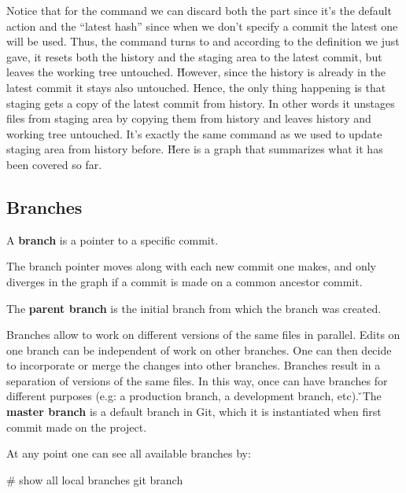 Notice that for the command  we can discard both the  part
since it's the default action and the ``latest hash'' since when we don't specify a commit the latest one will be
used. Thus, the command turns to  and according to the definition we just gave, it resets both the
history and the staging area to the latest commit, but leaves the working tree untouched. \v

However, since the history is already in the latest commit it stays also untouched. Hence, the only thing happening
is that staging gets a copy of the latest commit from history. In other words it unstages files from staging area by
copying them from history and leaves history and working tree untouched. It’s exactly the same command as we used to
update staging area from history before. \v

Here is a graph that summarizes what it has been covered so far.


\subsection{Branches}

\bd[Branch]
A \textbf{branch} is a pointer to a specific commit.
\ed

The branch pointer moves along with each new commit one makes, and only diverges in the graph if a commit is made on a
common ancestor commit.

The \textbf{parent branch} is the initial branch from which the branch was created.
\ed

Branches allow to work on different versions of the same files in parallel. Edits on one branch can be independent of
work on other branches. One can then decide to incorporate or merge the changes into other branches. Branches result
in a separation of versions of the same files. In this way, once can have branches for different purposes (e.g: a
production branch, a development branch, etc). \v

The \textbf{master branch} is a default branch in Git, which it is instantiated when first commit made on the project.
\ed

At any point one can see all available branches by:

\begin{bash}
# show all local branches
git branch
\end{bash}

